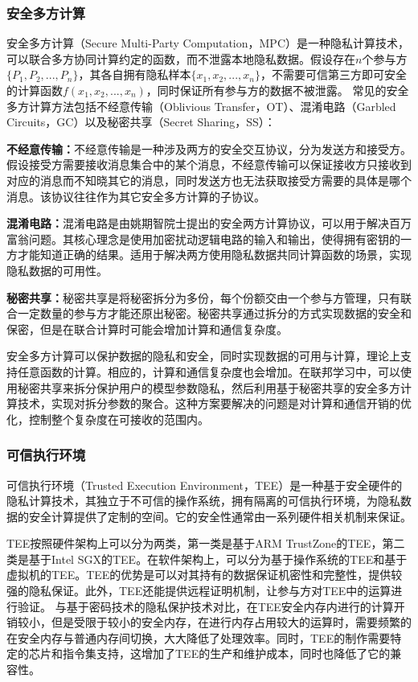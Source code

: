 \subsubsection{安全多方计算}
安全多方计算（Secure Multi-Party Computation，MPC）是一种隐私计算技术，可以联合多方协同计算约定的函数，而不泄露本地隐私数据。假设存在$n$个参与方$\{P_1, P_2,...,P_n\}$，其各自拥有隐私样本$\{x_1,x_2,...,x_n\}$，不需要可信第三方即可安全的计算函数$f(x_1,x_2,...,x_n)$，同时保证所有参与方的数据不被泄露。
常见的安全多方计算方法包括不经意传输（Oblivious Transfer，OT）、混淆电路（Garbled Circuits，GC）以及秘密共享（Secret Sharing，SS）：
\begin{compactitem}
	\item \textbf{不经意传输：}不经意传输\cite{rabin1981how}是一种涉及两方的安全交互协议，分为发送方和接受方。假设接受方需要接收消息集合中的某个消息，不经意传输可以保证接收方只接收到对应的消息而不知晓其它的消息，同时发送方也无法获取接受方需要的具体是哪个消息。该协议往往作为其它安全多方计算的子协议。
	\item \textbf{混淆电路：}混淆电路\cite{yao1986how}是由姚期智院士提出的安全两方计算协议，可以用于解决百万富翁问题。其核心理念是使用加密扰动逻辑电路的输入和输出，使得拥有密钥的一方才能知道正确的结果。适用于解决两方使用隐私数据共同计算函数的场景，实现隐私数据的可用性。
	\item \textbf{秘密共享：}秘密共享\cite{shamir1979share}是将秘密拆分为多份，每个份额交由一个参与方管理，只有联合一定数量的参与方才能还原出秘密。秘密共享通过拆分的方式实现数据的安全和保密，但是在联合计算时可能会增加计算和通信复杂度。
\end{compactitem}

安全多方计算可以保护数据的隐私和安全，同时实现数据的可用与计算，理论上支持任意函数的计算。相应的，计算和通信复杂度也会增加。在联邦学习中，可以使用秘密共享来拆分保护用户的模型参数隐私，然后利用基于秘密共享的安全多方计算技术，实现对拆分参数的聚合。这种方案要解决的问题是对计算和通信开销的优化，控制整个复杂度在可接收的范围内。

\subsubsection{可信执行环境}
可信执行环境（Trusted Execution Environment，TEE）\cite{costan2016intel}是一种基于安全硬件的隐私计算技术，其独立于不可信的操作系统，拥有隔离的可信执行环境，为隐私数据的安全计算提供了定制的空间。它的安全性通常由一系列硬件相关机制来保证。

TEE按照硬件架构上可以分为两类，第一类是基于ARM TrustZone的TEE\cite{pinto2019demystifying}，第二类是基于Intel SGX的TEE\cite{costan2016intel}。在软件架构上，可以分为基于操作系统的TEE和基于虚拟机的TEE。TEE的优势是可以对其持有的数据保证机密性和完整性，提供较强的隐私保证。此外，TEE还能提供远程证明机制，让参与方对TEE中的运算进行验证。
与基于密码技术的隐私保护技术对比，在TEE安全内存内进行的计算开销较小，但是受限于较小的安全内存，在进行内存占用较大的运算时，需要频繁的在安全内存与普通内存间切换，大大降低了处理效率。同时，TEE的制作需要特定的芯片和指令集支持，这增加了TEE的生产和维护成本，同时也降低了它的兼容性。

